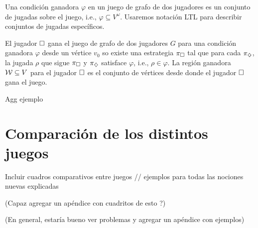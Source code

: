 \begin{definition}
	Una condición ganadora $\varphi$ en un juego de grafo de dos jugadores es un conjunto de jugadas sobre el juego, i.e., $\varphi \subseteq V^\omega$. Usaremos notación LTL para describir conjuntos de jugadas específicos.
\end{definition}

\begin{definition}
	El jugador $\square$ gana el juego de grafo de dos jugadores $G$ para una condición ganadora $\varphi$ desde un vértice $v_0$ so existe una estrategia $\pi_\square$ tal que para cada $\pi_\diamondsuit$, la jugada $\rho$ que sigue $\pi_\square$ y $\pi_\diamondsuit$ satisface $\varphi$, i.e., $\rho \in \varphi$.
	La región ganadora $\mathcal{W} \subseteq V$ para el jugador $\square$ es el conjunto de vértices desde donde el jugador $\square$ gana el juego.
\end{definition}

Agg ejemplo

\section{Comparación de los distintos juegos}

Incluir cuadros comparativos entre juegos // ejemplos para todas las nociones
nuevas explicadas

(Capaz agregar un apéndice con cuadritos de esto ?)

(En general, estaría bueno ver problemas y agregar un apéndice con ejemplos)